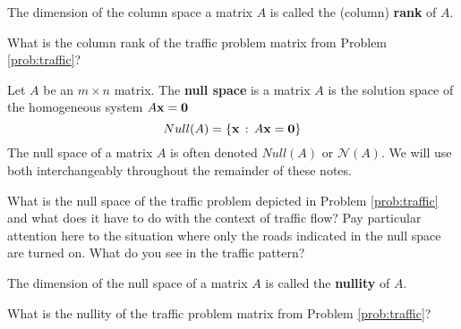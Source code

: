 \begin{definition}
    The dimension of the column space a matrix $A$ is called the (column) {\bf rank} of $A$.
\end{definition}
\begin{problem}
    What is the column rank of the traffic problem matrix from Problem \ref{prob:traffic}?
\end{problem}

\begin{definition}
        Let $A$ be an $m \times n$ matrix.  The {\bf null space} is a matrix $A$ is the
        solution space of the homogeneous system $A {\bf x} = {\bf 0}$ 
        \[ Null(A) = \{ {\bf x} \, : \,
        A{\bf x} = {\bf 0} \} \]
        The null space of a matrix $A$ is often denoted $Null(A)$ or $\mathcal{N}(A)$.  We
        will use both interchangeably throughout the remainder of these notes.
\end{definition}
\begin{problem}
    What is the null space of the traffic problem depicted in Problem \ref{prob:traffic}
    and what does it have to do with the context of traffic flow?  Pay particular
    attention here to the situation where only the roads indicated in the null space are
    turned on.  What do you see in the traffic pattern?  
\end{problem}

\begin{definition}
    The dimension of the null space of a matrix $A$ is called the {\bf nullity} of $A$.
\end{definition}
\begin{problem}
    What is the nullity of the traffic problem matrix from Problem \ref{prob:traffic}?
\end{problem}

